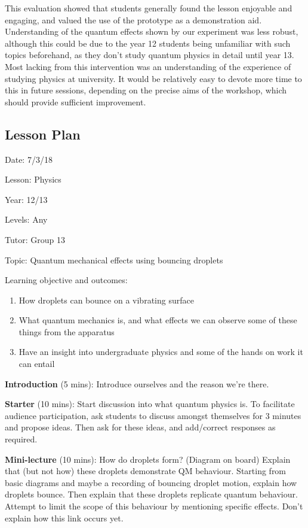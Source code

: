 This evaluation showed that students generally found the lesson enjoyable and engaging, and valued the use of the prototype as a demonstration aid. Understanding of the quantum effects shown by our experiment was less robust, although this could be due to the year 12 students being unfamiliar with such topics beforehand, as they don't study quantum physics in detail until year 13. Most lacking from this intervention was an understanding of the experience of studying physics at university. It would be relatively easy to devote more time to this in future sessions, depending on the precise aims of the workshop, which should provide sufficient improvement.

\clearpage

\subsection{Lesson Plan} \label{lessonplan}

\noindent Date: 7/3/18

\noindent Lesson: Physics

\noindent Year: 12/13

\noindent Levels: Any

\noindent Tutor: Group 13

\noindent Topic: Quantum mechanical effects using bouncing droplets


\noindent Learning objective and outcomes:
\begin{enumerate}
\item How droplets can bounce on a vibrating surface
\item What quantum mechanics is, and what effects we can observe some of these things from the apparatus
\item Have an insight into undergraduate physics and some of the hands on work it can entail
\end{enumerate}

\noindent \textbf{Introduction} (5 mins): Introduce ourselves and the reason we're there. 

\noindent \textbf{Starter} (10 mins): Start discussion into what quantum physics is. To facilitate audience participation, ask students to discuss amongst themselves for 3 minutes and propose ideas. Then ask for these ideas, and add/correct responses as required.

\noindent \textbf{Mini-lecture} (10 mins): How do droplets form? (Diagram on board) Explain that (but not how) these droplets demonstrate QM behaviour. Starting from basic diagrams and maybe a recording of bouncing droplet motion, explain how droplets bounce. Then explain that these droplets replicate quantum behaviour. Attempt to limit the scope of this behaviour by mentioning specific effects. Don't explain how this link occurs yet.

